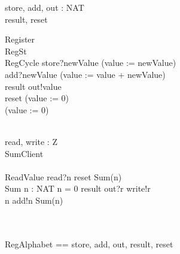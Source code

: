 \documentclass{llncs}
\begin{document}
\begin{circus}
\circchannel store, add, out : NAT\\
\circchannel result, reset\\
\end{circus}
\begin{circus}
\circprocess Register \circdef\\
	\circbegin \circstate RegSt \\
	RegCycle \circdef store?newValue \then (value := newValue)\\
	\extchoice add?newValue \then (value := value + newValue)\\
	\extchoice result \then out!value \then \Skip\\
	\extchoice reset \then (value := 0)\\
\circspot (value := 0) \\
	\circend\\
\end{circus}
\begin{circus}
\circchannel read, write : Z\\
\circprocess SumClient \circdef\\
	\circbegin\\
	ReadValue \circdef read?n \then reset \then Sum(n)\\
	Sum \circdef n : NAT \circspot \lcircguard n = 0 \rcircguard \circguard result \then out?r \then write!r \then \Skip\\
	\extchoice \lcircguard n  \rcircguard \circguard add!n \then Sum(n)\\
\circspot \Skip\\
	\circend\\
\end{circus}
\begin{circus}
\circchannelset RegAlphabet == \lchanset store, add, out, result, reset \rchanset\\
\end{circus}
\end{document}
